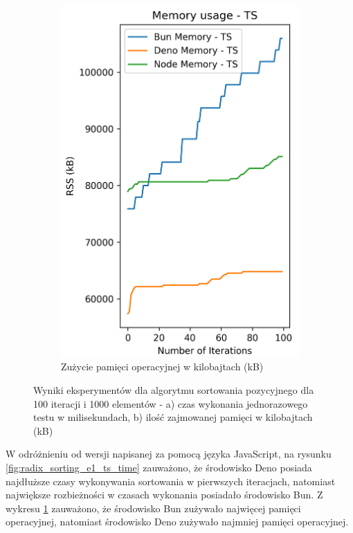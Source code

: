 \begin{figure}[H]
\begin{subfigure}[b]{0.44\textwidth}
  \end{subfigure}
  \begin{subfigure}[b]{0.44\textwidth}
    \centering
    \includegraphics[width=\textwidth]{Figures/sorting/sorting_radix_100_1000_ts_memory.png}
    \caption{Zużycie pamięci operacyjnej w kilobajtach (kB)}
    \label{fig:radix_sorting_e1_ts_memory}
  \end{subfigure}
  \caption{Wyniki eksperymentów dla algorytmu sortowania pozycyjnego dla 100 iteracji i 1000 elementów - a) czas wykonania jednorazowego testu w milisekundach, b) ilość zajmowanej pamięci w kilobajtach (kB)}
  \label{fig:radix_sorting_e1_ts}
\end{figure}

W odróżnieniu od wersji napisanej za pomocą języka JavaScript, na rysunku \ref{fig:radix_sorting_e1_ts_time} zauważono, że środowisko Deno posiada najdłuższe czasy wykonywania sortowania w pierwszych iteracjach, natomiast największe rozbieżności w czasach wykonania posiadało środowisko Bun. Z wykresu \ref{fig:radix_sorting_e1_ts_memory} zauważono, że środowisko Bun zużywało najwięcej pamięci operacyjnej, natomiast środowisko Deno zużywało najmniej pamięci operacyjnej.

